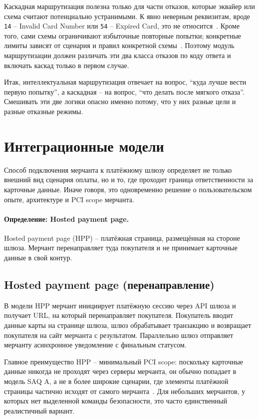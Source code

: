 Каскадная маршрутизация полезна только для части отказов,
которые эквайер или схема считают потенциально устранимыми.
К явно неверным реквизитам, вроде \texttt{14} -- Invalid Card Number
или \texttt{54} -- Expired Card, это не относится~\cite{mc-tpr}.
Кроме того, сами схемы ограничивают избыточные повторные
попытки; конкретные лимиты зависят от сценария и правил
конкретной схемы~\cite{mc-retry-rules}. Поэтому модуль
маршрутизации должен различать эти два класса отказов
по коду ответа и включать каскад только в первом случае.

Итак, интеллектуальная маршрутизация отвечает на вопрос,
\enquote{куда лучше вести первую попытку}, а каскадная --
на вопрос, \enquote{что делать после мягкого отказа}. Смешивать
эти две логики опасно именно потому, что у них разные цели
и разные отказные режимы.

\section{Интеграционные модели}
\label{sec:gw-integration}

Способ подключения мерчанта к платёжному шлюзу определяет
не только внешний вид сценария оплаты, но и то, где проходит
граница ответственности за карточные данные. Иначе говоря,
это одновременно решение о пользовательском опыте, архитектуре
и PCI scope мерчанта.

\paragraph{Определение: Hosted payment page.}
Hosted payment page (HPP) -- платёжная страница, размещённая на стороне шлюза. Мерчант перенаправляет туда покупателя и не принимает карточные данные в свой контур.
\subsection*{Hosted payment page (перенаправление)}

В модели HPP мерчант инициирует платёжную сессию через API шлюза
и получает URL, на который перенаправляет покупателя. Покупатель
вводит данные карты на странице шлюза, шлюз обрабатывает транзакцию
и возвращает покупателя на сайт мерчанта с результатом. Параллельно
шлюз отправляет мерчанту асинхронное уведомление с финальным
статусом.

Главное преимущество HPP -- минимальный PCI scope: поскольку
карточные данные никогда не проходят через серверы мерчанта,
он обычно попадает в модель SAQ A, а не в более широкие
сценарии, где элементы платёжной страницы частично исходят
от самого мерчанта~\cite{pci-faq-1291,pci-faq-1293}. Для небольших мерчантов,
у которых нет выделенной команды безопасности, это часто
единственный реалистичный вариант.

